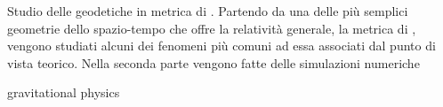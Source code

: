 Studio delle geodetiche in metrica di \Sh{}.
Partendo da una delle più semplici geometrie dello spazio-tempo che offre la relatività generale, la metrica di \Sh{}, vengono studiati alcuni dei fenomeni più comuni ad essa associati dal punto di vista teorico.
Nella seconda parte vengono fatte delle simulazioni numeriche

gravitational physics

